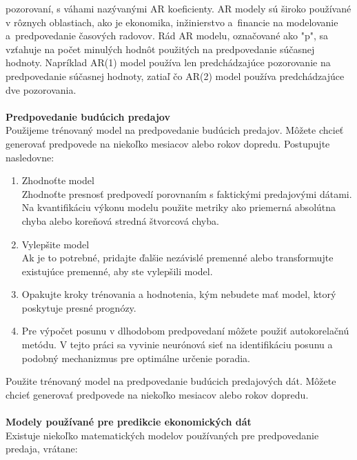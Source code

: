     pozorovaní, s váhami nazývanými AR koeficienty. AR modely sú široko používané v rôznych oblastiach, ako je ekonomika,
    inžinierstvo a~financie na modelovanie a~predpovedanie časových radovov. Rád AR modelu, označované
    ako "p", sa vzťahuje na počet minulých hodnôt použitých na predpovedanie súčasnej hodnoty. Napríklad AR(1) model
    používa len predchádzajúce pozorovanie na predpovedanie súčasnej hodnoty, zatiaľ čo AR(2) model používa predchádzajúce
    dve pozorovania.\\
    \\
    \textbf{Predpovedanie budúcich predajov}\\
    Použijeme trénovaný model na predpovedanie budúcich predajov. Môžete chcieť generovať predpovede na niekoľko
    mesiacov alebo rokov dopredu. Postupujte nasledovne:
    \begin{enumerate}
        \item Zhodnoťte model\\
        Zhodnoťte presnosť predpovedí porovnaním s faktickými predajovými dátami. Na kvantifikáciu výkonu modelu
        použite metriky ako priemerná absolútna chyba alebo koreňová stredná štvorcová chyba.
        \item Vylepšite model\\
        Ak je to potrebné, pridajte ďalšie nezávislé premenné alebo transformujte existujúce premenné, aby ste vylepšili
        model.
        \item Opakujte kroky trénovania a hodnotenia, kým nebudete mať model, ktorý poskytuje presné prognózy.
        \item Pre výpočet posunu v dlhodobom predpovedaní môžete použiť autokorelačnú metódu. V tejto práci sa vyvinie
        neurónová sieť na identifikáciu posunu a podobný mechanizmus pre optimálne určenie poradia.
    \end{enumerate}
    Použite trénovaný model na predpovedanie budúcich predajových dát. Môžete chcieť generovať
    predpovede na niekoľko mesiacov alebo rokov dopredu.\\
    \\
    \textbf{Modely používané pre predikcie ekonomických dát} \\
    Existuje niekoľko matematických modelov používaných pre predpovedanie predaja, vrátane:\\

